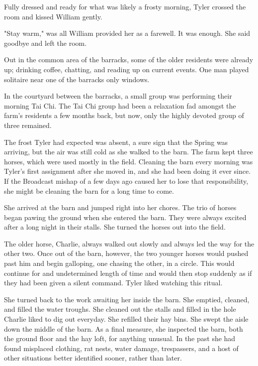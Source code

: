 \documentclass[courier]{sffms}
\begin{document}
Fully dressed and ready for what was likely
a frosty morning, Tyler crossed the room and
kissed William gently. 

"Stay warm," was all William provided her as
a farewell. It was enough. She said goodbye
and left the room.

Out in the common area of the barracks,
some of the older residents were already up;
drinking coffee, chatting, and reading up on
current events. One man played solitaire near
one of the barracks only windows.

In the courtyard between the barracks, a small
group was performing their morning Tai Chi.
The Tai Chi group had been a relaxation fad 
amongst the farm's residents a
few months back, but now, only the highly
devoted group of three remained.

The frost Tyler had expected was absent, a sure
sign that the Spring was arriving, but the air
was still cold as she walked to the barn. The farm
kept three horses, which were used mostly in the
field. Cleaning the barn every morning was Tyler's 
first assignment after she moved in, and she had
been doing it ever since. If the Broadcast mishap
of a few days ago caused her to lose that
responsibility, she might be cleaning the barn
for a long time to come.

She arrived at the barn and jumped right into
her chores. The trio of horses began pawing the
ground when she entered the barn. They were
always excited after a long night in their stalls.
She turned the horses out into the field.

The older horse, Charlie, always walked out slowly
and always led the way for the other two. Once
out of the barn, however, the two younger horses
would pushed past him and begin galloping, one
chasing the other, in a circle. This would continue
for and undetermined length of time and would 
then stop suddenly as if they had been given a
silent command. Tyler liked watching this ritual.

She turned back to the work awaiting her inside
the barn. She emptied, cleaned, and filled the
water troughs. She cleaned out the stalls and 
filled in the hole Charlie liked to dig out everyday.
She refilled their hay bins. She swept the aisle down
the middle of the barn. As a final measure, she
inspected the barn, both the ground floor and
the hay loft, for anything unusual. In the past
she had found misplaced clothing, 
rat nests, water damage, trespassers, and a host
of other situations better identified sooner, rather
than later.
\end{document}

